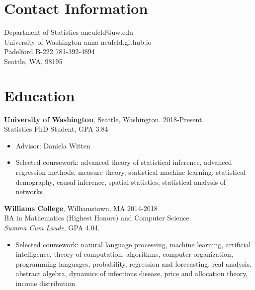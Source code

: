 \documentclass[margin, 10pt]{res} %
\begin{document}
\begin{resume}

 

\section{Contact Information}
Department of Statistics \hfill  aneufeld@uw.edu\\
University of Washington \hfill anna-neufeld.github.io \\
Padelford B-222  \hfill 781-392-4894 \\
Seattle, WA, 98195



\section{Education} 

{\textbf{University of Washington},} Seattle, Washington. \hfill 2018-Present \\
Statistics PhD Student, GPA 3.84 
\begin{itemize}
\item Advisor: Daniela Witten
\item Selected coursework: advanced theory of statistical inference, advanced regression methods, measure theory, statistical machine learning, statistical demography, causal inference, spatial statistics, statistical analysis of networks
\end{itemize}

{\textbf{Williams College}}, Williamstown, MA \hfill 2014-2018  \\
BA in Mathematics (Highest Honors) and Computer Science. \\ 
\textit{Summa Cum Laude}, GPA 4.04. 
\begin{itemize}
\item Selected coursework: natural language processing, machine learning, artificial intelligence, theory of computation, algorithms, computer organization, programming languages, probability, regression and forecasting, real analysis, abstract algebra, dynamics of infectious disease, price and allocation theory, income distribution
\end{itemize}
 

\end{resume}
\end{document}
